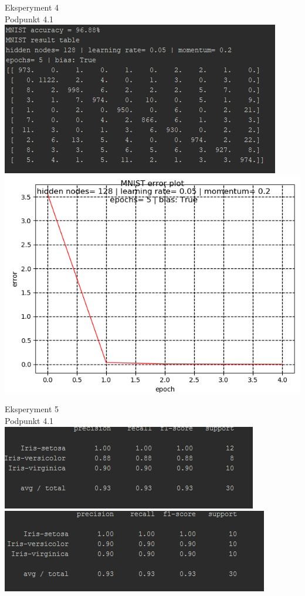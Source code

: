 \documentclass{classrep}
\begin{document}
{Eksperyment 4\\
Podpunkt 4.1\\
\includegraphics{imgs/MNIST1_1.png}\\
\includegraphics{imgs/MNIST1.png}\\
}

{Eksperyment 5\\
Podpunkt 4.1\\
\includegraphics{imgs/KNN11.png}\\
\includegraphics{imgs/KNN21.png}\\
}
\end{document}
